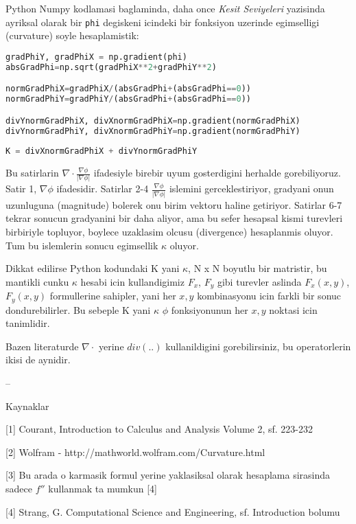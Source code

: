 \documentclass[12pt,fleqn]{article}
\begin{document}
Python Numpy kodlamasi baglaminda, daha once {\em Kesit Seviyeleri} yazisinda
ayriksal olarak bir \verb!phi! degiskeni icindeki bir fonksiyon uzerinde
egimselligi (curvature) soyle hesaplamistik:

\begin{lstlisting}[language=Python]
gradPhiY, gradPhiX = np.gradient(phi)
absGradPhi=np.sqrt(gradPhiX**2+gradPhiY**2)                               

normGradPhiX=gradPhiX/(absGradPhi+(absGradPhi==0))
normGradPhiY=gradPhiY/(absGradPhi+(absGradPhi==0))

divYnormGradPhiX, divXnormGradPhiX=np.gradient(normGradPhiX)
divYnormGradPhiY, divXnormGradPhiY=np.gradient(normGradPhiY)
                       
K = divXnormGradPhiX + divYnormGradPhiY
\end{lstlisting}

Bu satirlarin $\nabla \cdot \frac{\nabla \phi}{|\nabla \phi|}$ ifadesiyle
birebir uyum gosterdigini herhalde gorebiliyoruz. Satir 1, $\nabla \phi$
ifadesidir. Satirlar 2-4 $\frac{\nabla \phi}{|\nabla \phi|}$ islemini
gerceklestiriyor, gradyani onun uzunluguna (magnitude) bolerek onu birim vektoru
haline getiriyor. Satirlar 6-7 tekrar sonucun gradyanini bir daha aliyor, ama bu
sefer hesapsal kismi turevleri birbiriyle topluyor, boylece uzaklasim olcusu
(divergence) hesaplanmis oluyor. Tum bu islemlerin sonucu egimsellik $\kappa$
oluyor.

Dikkat edilirse Python kodundaki K yani $\kappa$, N x N boyutlu bir matristir,
bu mantikli cunku $\kappa$ hesabi icin kullandigimiz $F_x$, $F_y$ gibi
turevler aslinda $F_x(x,y)$, $F_y(x,y)$ formullerine sahipler, yani her $x,y$
kombinasyonu icin farkli bir sonuc dondurebilirler. Bu sebeple K yani $\kappa$
$\phi$ fonksiyonunun her $x,y$ noktasi icin tanimlidir. 

Bazen literaturde $\nabla \cdot$ yerine $div(..)$ kullanildigini gorebilirsiniz,
bu operatorlerin ikisi de aynidir.

--

Kaynaklar

[1] Courant, Introduction to Calculus and Analysis Volume 2, sf. 223-232

[2] Wolfram - http://mathworld.wolfram.com/Curvature.html

[3] Bu arada o karmasik formul yerine yaklasiksal olarak hesaplama
sirasinda sadece $f''$ kullanmak ta mumkun [4]

[4] Strang, G. Computational Science and Engineering, sf. Introduction bolumu
\end{document}
